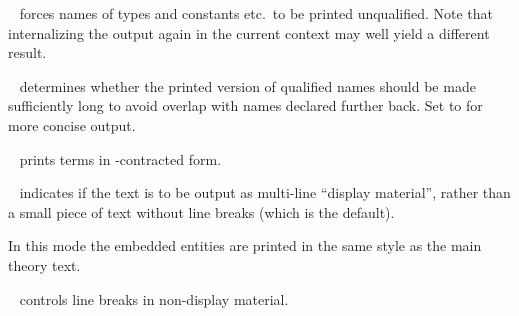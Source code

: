 \begin{isabellebody}
\begin{isamarkuptext}
\begin{description}
  \item {}\hypertarget{antiquotation option.short-names}{\hyperlink{antiquotation option.short-names}{\mbox{}}}~
  forces names of types and constants etc.\ to be printed unqualified.
  Note that internalizing the output again in the current context may
  well yield a different result.

  \item {}\hypertarget{antiquotation option.unique-names}{\hyperlink{antiquotation option.unique-names}{\mbox{}}}~
  determines whether the printed version of qualified names should be
  made sufficiently long to avoid overlap with names declared further
  back.  Set to  for more concise output.

  \item {}\hypertarget{antiquotation option.eta-contract}{\hyperlink{antiquotation option.eta-contract}{\mbox{}}}~
  prints terms in -contracted form.

  \item {}\hypertarget{antiquotation option.display}{\hyperlink{antiquotation option.display}{\mbox{}}}~ indicates
  if the text is to be output as multi-line ``display material'',
  rather than a small piece of text without line breaks (which is the
  default).

  In this mode the embedded entities are printed in the same style as
  the main theory text.

  \item {}\hypertarget{antiquotation option.break}{\hyperlink{antiquotation option.break}{\mbox{}}}~ controls
  line breaks in non-display material.


\end{description}
\end{isamarkuptext}
\end{isabellebody}
